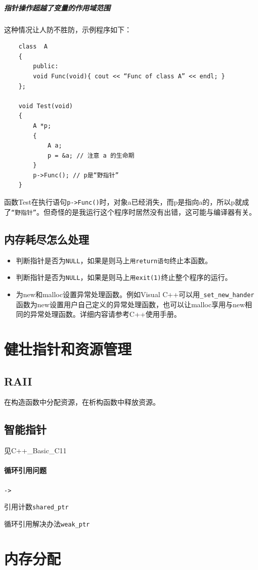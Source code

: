 \documentclass[UTF8,a4paper,12pt]{ctexbook}
\begin{document}
			
			\subparagraph{指针操作超越了变量的作用域范围}
				这种情况让人防不胜防，示例程序如下：
				\begin{lstlisting}
	class  A
	{
		public:
		void Func(void){ cout << “Func of class A” << endl; }
	};
	
	void Test(void)
	{	
		A *p;	
		{			
			A a;			
			p = &a; // 注意 a 的生命期
		}
		p->Func(); // p是“野指针”
	}
				\end{lstlisting}
				函数Test在执行语句\verb|p->Func()|时，对象a已经消失，而p是指向a的，所以p就成了\verb|“野指针”|。但奇怪的是我运行这个程序时居然没有出错，这可能与编译器有关。

		\subsection{内存耗尽怎么处理}
			\begin{itemize}
				\item 判断指针是否为\verb|NULL|，如果是则马上\verb|用return语句|终止本函数。
				\item 判断指针是否为\verb|NULL|，如果是则马上\verb|用exit(1)|终止整个程序的运行。
				\item 为new和malloc设置异常处理函数。例如Visual C++可以用\verb|_set_new_hander|函数为new设置用户自己定义的异常处理函数，也可以让malloc享用与new相同的异常处理函数。详细内容请参考C++使用手册。
			\end{itemize}
		

	\section{健壮指针和资源管理}
		\subsection{RAII}
			在构造函数中分配资源，在析构函数中释放资源。
		\subsection{智能指针}
			见C++\_Basic\_C11
			
			\paragraph{循环引用问题}\verb|->|
			
				引用计数\verb|shared_ptr|
		
				循环引用解决办法\verb|weak_ptr|
	
	\section{内存分配}
\end{document}
